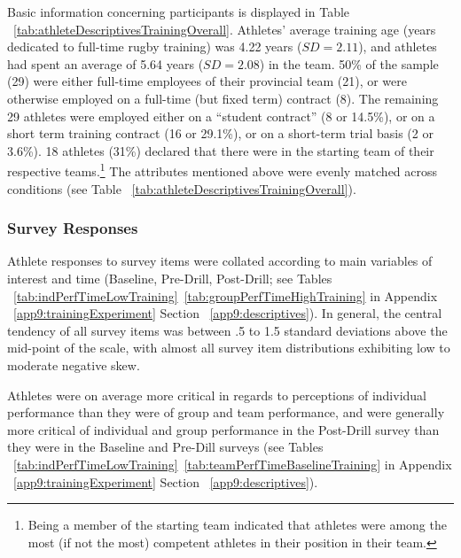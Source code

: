 

Basic information concerning participants is displayed in Table ~\ref{tab:athleteDescriptivesTrainingOverall}.  Athletes' average training age (years dedicated to full-time rugby training) was 4.22 years ($SD = 2.11$), and athletes had spent an average of 5.64 years ($SD = 2.08$) in the team.  50\% of the sample (29) were either full-time employees of their provincial team (21), or were otherwise employed on a full-time (but fixed term) contract (8).  The remaining 29 athletes were employed either on a ``student contract'' (8 or 14.5\%), or on a short term training contract (16 or 29.1\%), or on a short-term trial basis (2 or 3.6\%).  18 athletes (31\%) declared that there were in the starting team of their respective teams.\footnote{Being a member of the starting team indicated that athletes were among the most (if not the most) competent athletes in their position in their team.}
The attributes mentioned above were evenly matched across conditions (see Table ~\ref{tab:athleteDescriptivesTrainingOverall}).


\subsubsection{Survey Responses\label{sec:surveyResponses}}
Athlete responses to survey items were collated according to main variables of interest and time (Baseline, Pre-Drill, Post-Drill; see Tables ~\ref{tab:indPerfTimeLowTraining}\nobreakdash~\ref{tab:groupPerfTimeHighTraining} in Appendix ~\ref{app9:trainingExperiment} Section ~\ref{app9:descriptives}).  In general, the central tendency of all survey items was between .5 to 1.5 standard deviations above the mid-point of the scale, with almost all survey item distributions exhibiting low to moderate negative skew.

Athletes were on average more critical in regards to perceptions of individual performance than they were of group and team performance, and were generally more critical of individual and group performance in the Post-Drill survey than they were in the Baseline and Pre-Dill surveys (see Tables ~\ref{tab:indPerfTimeLowTraining}\nobreakdash~\ref{tab:teamPerfTimeBaselineTraining} in Appendix ~\ref{app9:trainingExperiment} Section ~\ref{app9:descriptives}).


